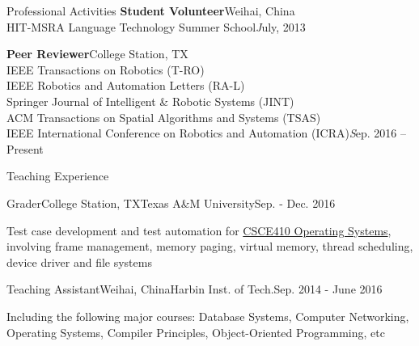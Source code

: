 \documentclass{resume} %
\begin{document}
\begin{rSection}{Professional Activities}
{\bf Student Volunteer}\hfill Weihai, China\\
HIT-MSRA Language Technology Summer School\hfill {\emph July, 2013}
\vspace*{-0.2em}

{\bf Peer Reviewer}\hfill College Station, TX\\
IEEE Transactions on Robotics (T-RO)\\
IEEE Robotics and Automation Letters (RA-L)\\
Springer Journal of Intelligent \& Robotic Systems (JINT)\\
ACM Transactions on Spatial Algorithms and Systems (TSAS)\\
IEEE International Conference on Robotics and Automation (ICRA)\hfill {\emph Sep. 2016 -- Present}

{\bf }
\end{rSection}

\begin{rSection}{Teaching Experience}
\begin{rSubsection}{Grader}{College Station, TX}{Texas A\&M University}{Sep. - Dec. 2016}
\item Test case development and test automation for \href{http://faculty.cse.tamu.edu/dilma/web-csce410-fall16/index.htm}{CSCE410 Operating Systems}, involving frame management, memory paging, virtual memory, thread scheduling, device driver and file systems
\end{rSubsection}

\begin{rSubsection}{Teaching Assistant}{Weihai, China}{Harbin Inst. of Tech.}{Sep. 2014 - June 2016}
\item Including the following major courses: Database Systems, Computer Networking, Operating Systems, Compiler Principles, Object-Oriented Programming, etc
\end{rSubsection}
\end{rSection}
\end{document}
